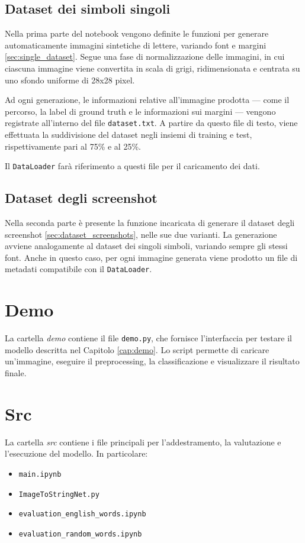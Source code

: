 \subsection*{Dataset dei simboli singoli}
Nella prima parte del notebook vengono definite le funzioni per generare automaticamente immagini sintetiche di lettere, variando font e margini \ref{sec:single_dataset}.  
Segue una fase di normalizzazione delle immagini, in cui ciascuna immagine viene convertita in scala di grigi, ridimensionata e centrata su uno sfondo uniforme di 28x28 pixel.

Ad ogni generazione, le informazioni relative all'immagine prodotta — come il percorso, la label di ground truth e le informazioni sui margini — vengono registrate all'interno del file \texttt{dataset.txt}.
A partire da questo file di testo, viene effettuata la suddivisione del dataset negli insiemi di training e test, rispettivamente pari al 75\% e al 25\%.

Il \texttt{DataLoader} farà riferimento a questi file per il caricamento dei dati.

\subsection*{Dataset degli screenshot}
Nella seconda parte è presente la funzione incaricata di generare il dataset degli screenshot \ref{sec:dataset_screenshots}, nelle sue due varianti. La generazione avviene analogamente al dataset dei singoli simboli, variando sempre gli stessi font.
Anche in questo caso, per ogni immagine generata viene prodotto un file di metadati compatibile con il \texttt{DataLoader}.

\section{Demo}
La cartella \emph{demo} contiene il file \texttt{demo.py}, che fornisce l'interfaccia per testare il modello descritta nel Capitolo \ref{cap:demo}. Lo script permette di caricare un'immagine, eseguire il preprocessing, la classificazione e visualizzare il risultato finale.

\section{Src}
La cartella \emph{src} contiene i file principali per l'addestramento, la valutazione e l'esecuzione del modello. In particolare:
\begin{itemize}
    \item \texttt{main.ipynb}
    \item \texttt{ImageToStringNet.py}
    \item \texttt{evaluation\_english\_words.ipynb}
    \item \texttt{evaluation\_random\_words.ipynb}
\end{itemize}

